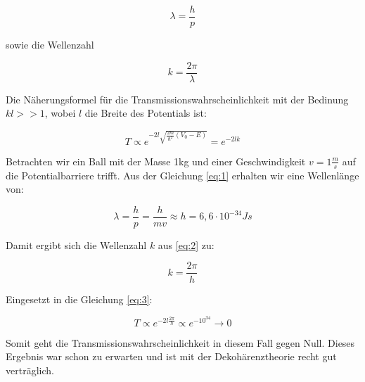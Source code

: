 \begin{equation} 
\label{eq:1}
\lambda = \frac{h}{p}  
\end{equation}

sowie die Wellenzahl

\begin{equation} 
\label{eq:2}
k=\frac{2\pi}{\lambda}
\end{equation}

Die Näherungsformel für die Transmissionswahrscheinlichkeit mit der Bedinung \( kl>>1 \), wobei \(l\) die Breite des Potentials ist:

\begin{equation} 
\label{eq:3}
T\propto e^{-2l\sqrt{\frac{2m}{\hbar^2}(V_0-E)}} = e^{-2lk} 
\end{equation}

Betrachten wir ein Ball mit der Masse 1kg und einer Geschwindigkeit \(v=1\frac{m}{s}\) auf die Potentialbarriere trifft. Aus der Gleichung \eqref{eq:1} erhalten wir eine Wellenlänge von:

\begin{equation}
  \label{eq:4}
  \lambda = \frac{h}{p} = \frac{h}{mv} \approx h=6,6\cdot 10^{-34} Js
\end{equation}

Damit ergibt sich die Wellenzahl \(k\) aus \eqref{eq:2} zu:

\begin{equation}
  \label{eq:5}
  k=\frac{2\pi}{h}
\end{equation}

Eingesetzt in die Gleichung \eqref{eq:3}:

\begin{equation} 
\label{eq:6}
T\propto e^{-2l\frac{2\pi}{h} }\propto e^{-10^{34}}\rightarrow 0 
\end{equation}


Somit geht die Transmissionswahrscheinlichkeit in diesem Fall gegen Null. Dieses Ergebnis war schon zu erwarten und ist mit der Dekohärenztheorie recht gut verträglich.






